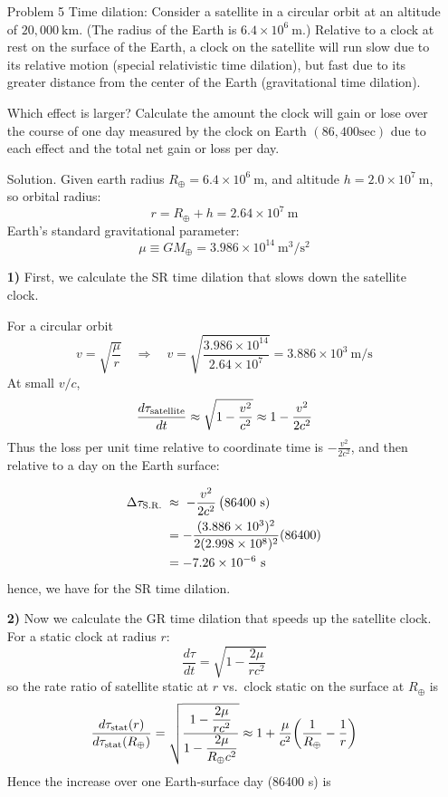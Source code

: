 \documentclass[12pt]{article}
\begin{document}
\newpage%
\begin{enumerate}
  \item[Problem 5] Time dilation: Consider a satellite in a circular orbit at an altitude of $20,000 \mathrm{~km}$. (The radius of the Earth is $6.4 \times 10^6 \mathrm{~m}$.) Relative to a clock at rest on the surface of the Earth, a clock on the satellite will run slow due to its relative motion (special relativistic time dilation), but fast due to its greater distance from the center of the Earth (gravitational time dilation).

  Which effect is larger? Calculate the amount the clock will gain or lose over the course of one day measured by the clock on Earth $(86,400 \mathrm{sec})$ due to each effect and the total net gain or loss per day.
  
  \item[Solution.]
  Given earth radius $R_\oplus=6.4\times10^{6}\ \mathrm{m}$, and altitude $h=2.0\times10^{7}\ \mathrm{m}$, so orbital radius:
  \[
  r=R_\oplus+h=2.64\times10^{7}\ \mathrm{m}
  \]
  Earth’s standard gravitational parameter:
  \[
  \mu\equiv GM_\oplus=3.986\times10^{14}\ \mathrm{m^3/s^2}
  \]

  \textbf{1)}
  First, we calculate the SR time dilation that slows down the satellite clock.

  For a circular orbit
  \[
  v=\sqrt{\frac{\mu}{r}}
  \quad\Longrightarrow\quad
  v=\sqrt{\frac{3.986\times10^{14}}{2.64\times10^{7}}}
  =3.886\times10^{3}\ \mathrm{m/s}
  \]
  At small $v/c$,
  \[
  \frac{d\tau_{\rm satellite}}{dt}\approx \sqrt{1-\frac{v^2}{c^2}}
  \approx 1-\frac{v^2}{2c^2}
  \]
  Thus the loss per unit time relative to coordinate time is $-\tfrac{v^2}{2c^2}$, and then relative to a day on the Earth surface:

  \[
  \begin{aligned}
  \Delta\tau_{\rm S.R.}\;&\approx\; -\frac{v^2}{2c^2}\,\big(86400 \text{ s})\\
  &=-\frac{(3.886\times10^{3})^2}{2(2.998\times10^{8})^2}(86400)\\
  &=-7.26\times10^{-6}\ \mathrm{s}
  \end{aligned}
  \]
  hence, we have  for the SR time dilation.

  \textbf{2)}
  Now we calculate the GR time dilation that speeds up the satellite clock. For a static clock at radius $r$:
  \[
  \frac{d\tau}{dt}=\sqrt{1-\frac{2\mu}{rc^2}}
  \]
  so the rate ratio of satellite static at $r$ vs.\ clock static on the surface at $R_\oplus$ is
  \[
  \frac{d\tau_{\rm stat}(r)}{d\tau_{\rm stat}(R_\oplus)}
  =\sqrt{\frac{1-\dfrac{2\mu}{rc^2}}{1-\dfrac{2\mu}{R_\oplus c^2}}}
  \approx 1+\frac{\mu}{c^2}\!\left(\frac{1}{R_\oplus}-\frac{1}{r}\right)
  \]
  Hence the increase over one Earth-surface day (86400 s) is


\end{enumerate}
\end{document}
